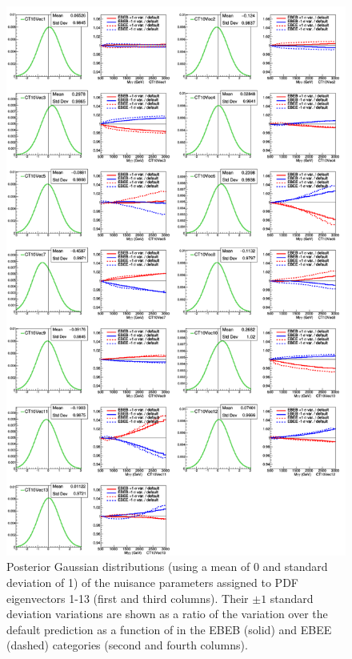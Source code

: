 \begin{figure}[!htbp]
	\centering
	\includegraphics[scale=0.26]{figures/Multi_PDFs_A.pdf}
	\caption{Posterior Gaussian distributions (using a mean of 0 and standard deviation of 1) of the nuisance parameters assigned to PDF eigenvectors 1-13 (first and third columns). Their $\pm1$ standard deviation variations are shown as a ratio of the variation over the default prediction as a function of \mgg in the EBEB (solid) and EBEE (dashed) categories (second and fourth columns).}
	\label{fig:Multi_PDFs_A}
\end{figure}

